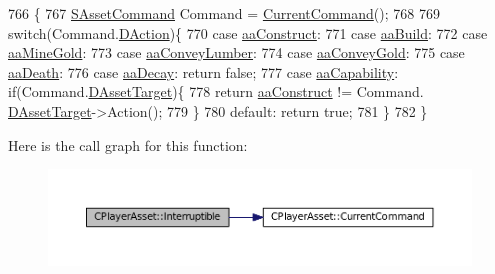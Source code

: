 \begin{DoxyCode}
766                                       \{
767     \hyperlink{structSAssetCommand}{SAssetCommand} Command = \hyperlink{classCPlayerAsset_ae2040e12e5319593c9a2d724c7b7eda0}{CurrentCommand}();
768     
769     \textcolor{keywordflow}{switch}(Command.\hyperlink{structSAssetCommand_a8edd3b3d59a76d5514ba403bc8076a75}{DAction})\{
770         \textcolor{keywordflow}{case} \hyperlink{GameDataTypes_8h_ab47668e651a3032cfb9c40ea2d60d670a7ef6b863f66dd7dcc95a199cd758ae1d}{aaConstruct}:
771         \textcolor{keywordflow}{case} \hyperlink{GameDataTypes_8h_ab47668e651a3032cfb9c40ea2d60d670a02b95b7163284c6e80c9008073d8480d}{aaBuild}:
772         \textcolor{keywordflow}{case} \hyperlink{GameDataTypes_8h_ab47668e651a3032cfb9c40ea2d60d670abc45b1c4fbca1481e373a780a69bd56b}{aaMineGold}:
773         \textcolor{keywordflow}{case} \hyperlink{GameDataTypes_8h_ab47668e651a3032cfb9c40ea2d60d670a7b0954302f27f46b3fdf6fddd530d154}{aaConveyLumber}:
774         \textcolor{keywordflow}{case} \hyperlink{GameDataTypes_8h_ab47668e651a3032cfb9c40ea2d60d670ae80ac4dde60023e0a1794e994db7000a}{aaConveyGold}:
775         \textcolor{keywordflow}{case} \hyperlink{GameDataTypes_8h_ab47668e651a3032cfb9c40ea2d60d670a917cb474275eadda79115015ef00d5df}{aaDeath}:
776         \textcolor{keywordflow}{case} \hyperlink{GameDataTypes_8h_ab47668e651a3032cfb9c40ea2d60d670a5529d58a84a26b10744433d7bf171451}{aaDecay}:       \textcolor{keywordflow}{return} \textcolor{keyword}{false};
777         \textcolor{keywordflow}{case} \hyperlink{GameDataTypes_8h_ab47668e651a3032cfb9c40ea2d60d670acf9fb164e8abd71c71f4a8c7fda360d4}{aaCapability}:  \textcolor{keywordflow}{if}(Command.\hyperlink{structSAssetCommand_a3d9b43f6e59c386c48c41a65448a0c39}{DAssetTarget})\{
778                                 \textcolor{keywordflow}{return} \hyperlink{GameDataTypes_8h_ab47668e651a3032cfb9c40ea2d60d670a7ef6b863f66dd7dcc95a199cd758ae1d}{aaConstruct} != Command.
      \hyperlink{structSAssetCommand_a3d9b43f6e59c386c48c41a65448a0c39}{DAssetTarget}->Action();  
779                             \}
780         \textcolor{keywordflow}{default}:            \textcolor{keywordflow}{return} \textcolor{keyword}{true};
781     \}
782 \}
\end{DoxyCode}
Here is the call graph for this function\+:
\nopagebreak
\begin{figure}[H]
\begin{center}
\leavevmode
\includegraphics[width=350pt]{classCPlayerAsset_a927a79955847918fa2807d37374b4fb6_cgraph}
\end{center}
\end{figure}
\hypertarget{classCPlayerAsset_aeaf2bc68dac6348ef48c2c49703325ad}{}\label{classCPlayerAsset_aeaf2bc68dac6348ef48c2c49703325ad} 
